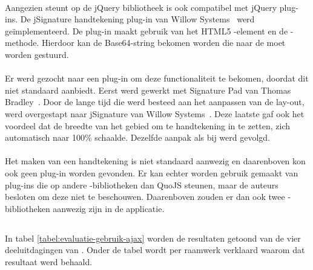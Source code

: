 \paragraph{\kendo}
Aangezien \kendo{} steunt op de jQuery bibliotheek is \kendo{} ook compatibel met jQuery plug-ins.
De jSignature handtekening plug-in van Willow Systems~\cite{Systems2013} werd geïmplementeerd.
De plug-in maakt gebruik van het HTML5 -element en de -methode.
Hierdoor kan de Base64-string bekomen worden die naar de  moet worden gestuurd.

\paragraph{\jqm}
Er werd gezocht naar een plug-in om deze functionaliteit te bekomen, doordat \jqm{} dit niet standaard aanbiedt. 
Eerst werd gewerkt met Signature Pad van Thomas Bradley~\cite{Bradley2013}. 
Door de lange tijd die werd besteed aan het aanpassen van de lay-out, werd overgestapt naar jSignature van Willow Systems~\cite{Systems2013}. 
Deze laatste gaf ook het voordeel dat de breedte van het gebied om te handtekening in te zetten, zich automatisch naar 100\% schaalde. 
Dezelfde aanpak als bij \kendo{} werd gevolgd.

\paragraph{\lungo}
Het maken van een handtekening is niet standaard aanwezig en daarenboven kon ook geen plug-in worden gevonden.
Er kan echter worden gebruik gemaakt van plug-ins die op andere \js{}-bibliotheken dan QuoJS steunen, maar de auteurs besloten om deze niet te beschouwen.
Daarenboven zouden er dan ook twee \js{}-bibliotheken aanwezig zijn in de applicatie.



\subsection{}
\label{sec:evaluatie-gebruik-ajax}

In tabel \ref{tabel:evaluatie-gebruik-ajax} worden de resultaten getoond van de vier deeluitdagingen van .
Onder de tabel wordt per raamwerk verklaard waarom dat resultaat werd behaald.

